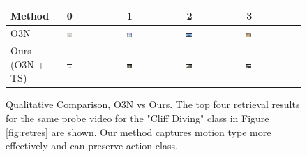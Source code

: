 \begin{figure}[t]
    \centering
        \begin{tabu} to \textwidth {|X[c,m]|X[c,m]X[c,m]X[c,m]X[c,m]|}
            \hline
            Method & 0 & 1 & 2 & 3 \\ \hline \hline
            O3N & 
            \includegraphics[width=0.1\textwidth]{images/o3vsmooth/o3/0.png}\vspace{2mm} & %
            \includegraphics[width=0.1\textwidth]{images/o3vsmooth/o3/1.png}\vspace{2mm} &
            \includegraphics[width=0.1\textwidth]{images/o3vsmooth/o3/2.png}\vspace{2mm} & 
            \includegraphics[width=0.1\textwidth]{images/o3vsmooth/o3/3.png}\vspace{2mm} \\
            Ours (O3N + TS) & 
            \includegraphics[width=0.1\textwidth]{images/o3vsmooth/smooth/0.png} &
            \includegraphics[width=0.1\textwidth]{images/o3vsmooth/smooth/1.png} &
            \includegraphics[width=0.1\textwidth]{images/o3vsmooth/smooth/2.png} & 
            \includegraphics[width=0.1\textwidth]{images/o3vsmooth/smooth/3.png} \\ \hline            
        \end{tabu}
        \caption{Qualitative Comparison, O3N vs Ours. The top four retrieval results for the same probe video for the "Cliff Diving" class in Figure \ref{fig:retres} are shown. Our method captures motion type more effectively and can preserve action class.}
        \label{fig:retcomp}
\end{figure}


